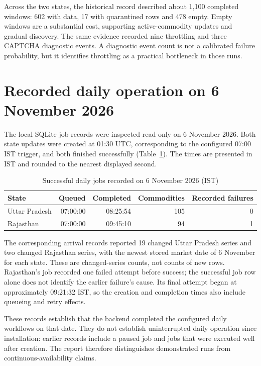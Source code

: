 \documentclass[12pt,a4paper,oneside]{report}
\numberwithin{equation}{chapter}
\numberwithin{figure}{chapter}
\numberwithin{table}{chapter}
\theoremstyle{definition}
\begin{document}
Across the two states, the historical record described about 1,100 completed windows: 602 with data, 17 with quarantined rows and 478 empty. Empty windows are a substantial cost, supporting active-commodity updates and gradual discovery. The same evidence recorded nine throttling and three CAPTCHA diagnostic events. A diagnostic event count is not a calibrated failure probability, but it identifies throttling as a practical bottleneck in those runs.

\section{Recorded daily operation on 6 November 2026}
The local SQLite job records were inspected read-only on 6 November 2026. Both state updates were created at 01:30 UTC, corresponding to the configured 07:00 IST trigger, and both finished successfully (Table~\ref{tab:dailyactual}). The times are presented in IST and rounded to the nearest displayed second.

\begin{table}[H]
\centering
\caption{Successful daily jobs recorded on 6 November 2026 (IST)}
\label{tab:dailyactual}
\small
\begin{tabular}{@{}lrrrr@{}}
\toprule
State & Queued & Completed & Commodities & Recorded failures \\
\midrule
Uttar Pradesh & 07:00:00 & 08:25:54 & 105 & 0 \\
Rajasthan & 07:00:00 & 09:45:10 & 94 & 1 \\
\bottomrule
\end{tabular}
\end{table}

The corresponding arrival records reported 19 changed Uttar Pradesh series and two changed Rajasthan series, with the newest stored market date of 6 November for each state. These are changed-series counts, not counts of new rows. Rajasthan's job recorded one failed attempt before success; the successful job row alone does not identify the earlier failure's cause. Its final attempt began at approximately 09:21:32 IST, so the creation and completion times also include queueing and retry effects.

These records establish that the backend completed the configured daily workflows on that date. They do not establish uninterrupted daily operation since installation: earlier records include a paused job and jobs that were executed well after creation. The report therefore distinguishes demonstrated runs from continuous-availability claims.
\end{document}
